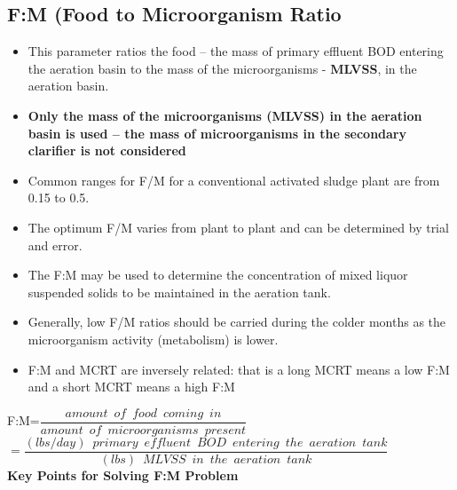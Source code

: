 \subsection{F:M (Food to Microorganism Ratio}

\begin{itemize}
\item This parameter ratios the food – the mass of primary effluent BOD entering the aeration basin to the mass of the microorganisms - \textbf{MLVSS}, in the aeration basin.
\item \textbf{Only the mass of the microorganisms (MLVSS) in the aeration basin is used – the mass of microorganisms in the secondary clarifier is not considered}
\item Common ranges for F/M for a conventional activated sludge plant are from 0.15 to 0.5. 
\item The optimum F/M varies from plant to plant and can be determined by trial and error.
\item The F:M may be used to determine the concentration of mixed liquor suspended solids to be maintained in the aeration tank.
\item Generally, low F/M ratios should be carried during the colder months as the microorganism activity (metabolism) is lower.
\item F:M and MCRT are inversely related: that is a long MCRT means a low F:M and a short MCRT means a high F:M
\end{itemize}
F:M=$\dfrac{amount \enspace of \enspace food \enspace coming \enspace in}{amount \enspace of \enspace microorganisms \enspace present}$\\
\vspace{0.3cm}
\hspace{0.7cm}$=\dfrac{(lbs/day) \enspace primary \enspace effluent  \enspace BOD \enspace entering \enspace the  \enspace aeration \enspace tank}{(lbs) \enspace MLVSS \enspace in \enspace the  \enspace aeration \enspace tank}$\\
\vspace{0.3cm}
\textbf{Key Points for Solving F:M Problem}\\
